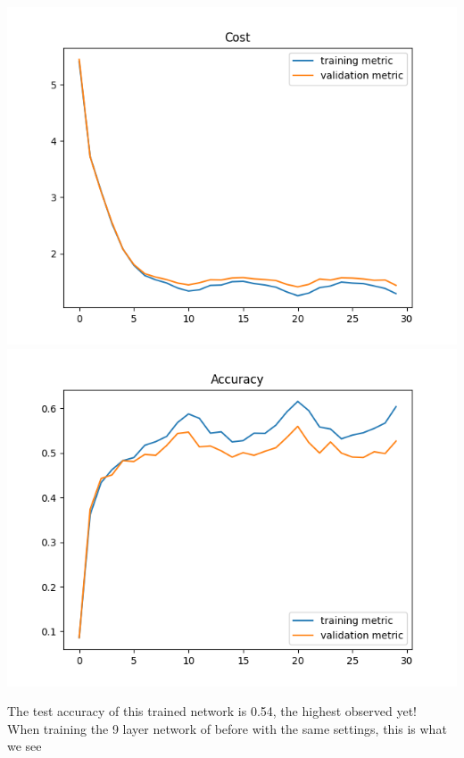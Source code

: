 \documentclass[11pt,a4paper]{article}
\begin{document}
\includegraphics[width=\textwidth]{optimal_cost_k=3.png}
\includegraphics[width=\textwidth]{optimal_accuracy_k=3.png}

The test accuracy of this trained network is 0.54, the highest observed yet!\\

When training the 9 layer network of before with the same settings, this is what we see\\
\end{document}
